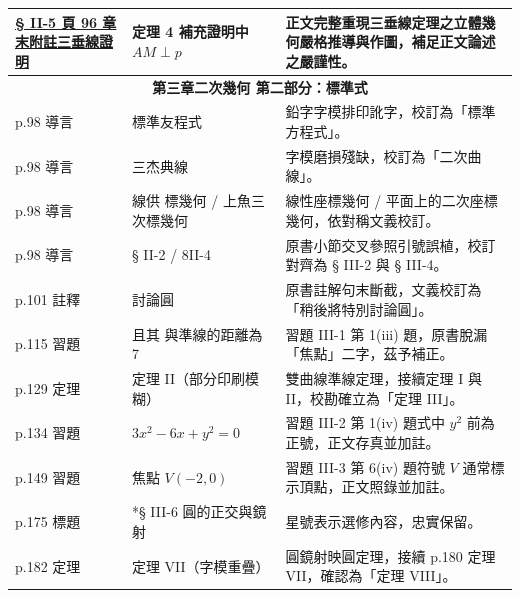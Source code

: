 \documentclass[a4paper,12pt,twoside]{article}
\begin{document}
\begin{table}[H]
\begin{tabularx}{\textwidth}{|p{3.0cm}|p{3.8cm}|X|}
\hyperref[note:b4s-ch2-p96-appendix-note]{§ II-5 頁 96 章末附註三垂線證明} & 
定理 4 補充證明中 $AM \perp p$ & 
正文完整重現三垂線定理之立體幾何嚴格推導與作圖，補足正文論述之嚴謹性。 \\ \hline

\multicolumn{3}{|c|}{\textbf{第三章\quad 二次幾何 第二部分：標準式}} \\ \hline

p.98 導言 & 標準友程式 & 鉛字字模排印訛字，校訂為「標準方程式」。 \\ \hline
p.98 導言 & 三杰典線 & 字模磨損殘缺，校訂為「二次曲線」。 \\ \hline
p.98 導言 & 線供 標幾何 / 上魚三次標幾何 & 線性座標幾何 / 平面上的二次座標幾何，依對稱文義校訂。 \\ \hline
p.98 導言 & § II-2 / 8II-4 & 原書小節交叉參照引號誤植，校訂對齊為 § III-2 與 § III-4。 \\ \hline
p.101 註釋 & 討論圓 & 原書註解句末斷截，文義校訂為「稍後將特別討論圓」。 \\ \hline
p.115 習題 & 且其 與準線的距離為 7 & 習題 III-1 第 1(iii) 題，原書脫漏「焦點」二字，茲予補正。 \\ \hline
p.129 定理 & 定理 II（部分印刷模糊） & 雙曲線準線定理，接續定理 I 與 II，校勘確立為「定理 III」。 \\ \hline
p.134 習題 & $3x^2 - 6x + y^2 = 0$ & 習題 III-2 第 1(iv) 題式中 $y^2$ 前為正號，正文存真並加註。 \\ \hline
p.149 習題 & 焦點 $V(-2,0)$ & 習題 III-3 第 6(iv) 題符號 $V$ 通常標示頂點，正文照錄並加註。 \\ \hline
p.175 標題 & *§ III-6 圓的正交與鏡射 & 星號表示選修內容，忠實保留。 \\ \hline
p.182 定理 & 定理 VII（字模重疊） & 圓鏡射映圓定理，接續 p.180 定理 VII，確認為「定理 VIII」。 \\ \hline

\end{tabularx}
\end{table}
\end{document}
